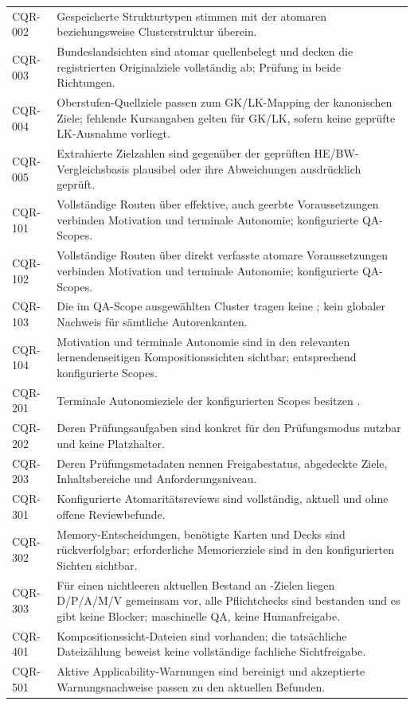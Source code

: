 \begin{longtable}{@{}P{23mm}P{125mm}@{}}
CQR-002 & Gespeicherte Strukturtypen stimmen mit der atomaren beziehungsweise Clusterstruktur überein.\\
CQR-003 & Bundeslandsichten sind atomar quellenbelegt und decken die registrierten Originalziele vollständig ab; Prüfung in beide Richtungen.\\
CQR-004 & Oberstufen-Quellziele passen zum GK/LK-Mapping der kanonischen Ziele; fehlende Kursangaben gelten für GK/LK, sofern keine geprüfte LK-Ausnahme vorliegt.\\
CQR-005 & Extrahierte Zielzahlen sind gegenüber der geprüften HE/BW-Vergleichsbasis plausibel oder ihre Abweichungen ausdrücklich geprüft.\\
CQR-101 & Vollständige Routen über effektive, auch geerbte Voraussetzungen verbinden Motivation und terminale Autonomie; konfigurierte QA-Scopes.\\
CQR-102 & Vollständige Routen über direkt verfasste atomare Voraussetzungen verbinden Motivation und terminale Autonomie; konfigurierte QA-Scopes.\\
CQR-103 & Die im QA-Scope ausgewählten Cluster tragen keine ; kein globaler Nachweis für sämtliche Autorenkanten.\\
CQR-104 & Motivation und terminale Autonomie sind in den relevanten lernendenseitigen Kompositionssichten sichtbar; entsprechend konfigurierte Scopes.\\
CQR-201 & Terminale Autonomieziele der konfigurierten Scopes besitzen .\\
CQR-202 & Deren Prüfungsaufgaben sind konkret für den Prüfungsmodus nutzbar und keine Platzhalter.\\
CQR-203 & Deren Prüfungsmetadaten nennen Freigabestatus, abgedeckte Ziele, Inhaltsbereiche und Anforderungsniveau.\\
CQR-301 & Konfigurierte Atomaritätsreviews sind vollständig, aktuell und ohne offene Reviewbefunde.\\
CQR-302 & Memory-Entscheidungen, benötigte Karten und Decks sind rückverfolgbar; erforderliche Memorierziele sind in den konfigurierten Sichten sichtbar.\\
CQR-303 & Für einen nichtleeren aktuellen Bestand an -Zielen liegen D/P/A/M/V gemeinsam vor, alle Pflichtchecks sind bestanden und es gibt keine Blocker; maschinelle QA, keine Humanfreigabe.\\
CQR-401 & Kompositionssicht-Dateien sind vorhanden; die tatsächliche Dateizählung beweist keine vollständige fachliche Sichtfreigabe.\\
CQR-501 & Aktive Applicability-Warnungen sind bereinigt und akzeptierte Warnungsnachweise passen zu den aktuellen Befunden.\\
\bottomrule
\end{longtable}
\endgroup

